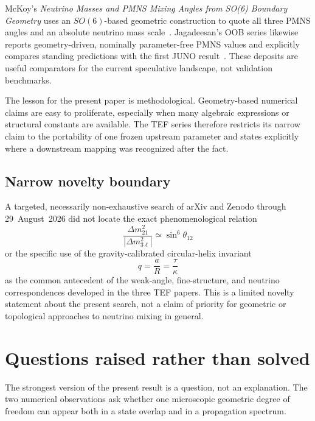 \documentclass[10pt,twocolumn]{article}
\begin{document}
McKoy's \emph{Neutrino Masses and PMNS Mixing Angles from SO(6) Boundary Geometry}
uses an $SO(6)$-based geometric construction to quote all three PMNS angles and an
absolute neutrino mass scale~\cite{McKoy2026}.  Jagadeesan's OOB series likewise
reports geometry-driven, nominally parameter-free PMNS values and explicitly
compares standing predictions with the first JUNO result~\cite{Jagadeesan2026}.
These deposits are useful comparators for the current speculative landscape, not
validation benchmarks.

The lesson for the present paper is methodological.  Geometry-based numerical
claims are easy to proliferate, especially when many algebraic expressions or
structural constants are available.  The TEF series therefore restricts its narrow
claim to the portability of one frozen upstream parameter and states explicitly
where a downstream mapping was recognized after the fact.

\subsection{Narrow novelty boundary}

A targeted, necessarily non-exhaustive search of arXiv and Zenodo through
29~August~2026 did not locate the exact phenomenological relation
\begin{equation}
\frac{\Delta m^2_{21}}{|\Delta m^2_{3\ell}|}
\simeq
\sin^6\theta_{12}
\end{equation}
or the specific use of the gravity-calibrated circular-helix invariant
\begin{equation}
q=\frac{a}{R}=\frac{\tau}{\kappa}
\end{equation}
as the common antecedent of the weak-angle, fine-structure, and neutrino
correspondences developed in the three TEF papers.  This is a limited novelty
statement about the present search, not a claim of priority for geometric or
topological approaches to neutrino mixing in general.

\section{Questions raised rather than solved}
\label{sec:questions}

The strongest version of the present result is a question, not an explanation.
The two numerical observations ask whether one microscopic geometric degree of
freedom can appear both in a state overlap and in a propagation spectrum.
\end{document}
